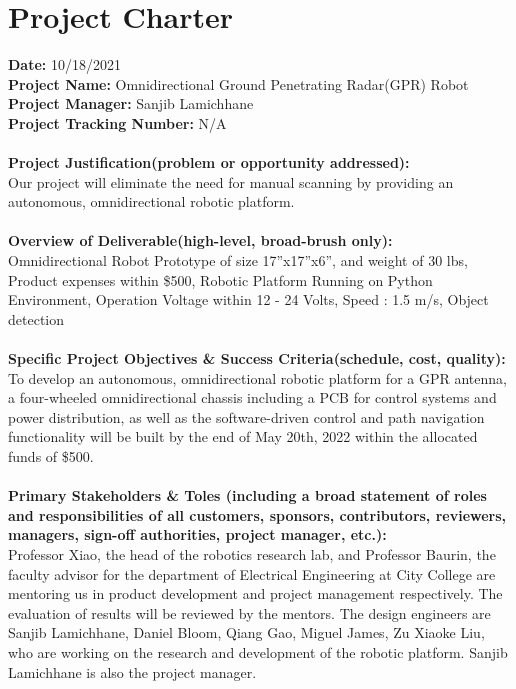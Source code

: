 \section{Project Charter}

\textbf{Date:} 10/18/2021\\
\textbf{Project Name:} Omnidirectional Ground Penetrating Radar(GPR) Robot 
\textbf{Project Manager:} Sanjib Lamichhane\\
\textbf{Project Tracking Number:} N/A \\
\\
\textbf{Project Justification(problem or opportunity addressed):}\\
Our project will eliminate the need for manual scanning by providing an autonomous, omnidirectional robotic platform.\\
\\
\textbf{Overview of Deliverable(high-level, broad-brush only):}\\
Omnidirectional Robot Prototype of size 17”x17”x6”, and weight of 30 lbs, Product expenses within \$500, Robotic Platform Running on Python Environment, Operation Voltage within 12 - 24 Volts, Speed : 1.5 m/s, Object detection
\\\\
\textbf{Specific Project Objectives \& Success Criteria(schedule, cost, quality):}\\
To develop an autonomous, omnidirectional robotic platform for a GPR antenna, a four-wheeled omnidirectional chassis including a PCB for control systems and power distribution, as well as the software-driven control and path navigation functionality will be built by the end of May 20th, 2022 within the allocated funds of \$500.\\
\\
\textbf{Primary Stakeholders \& Toles (including a broad statement of roles and responsibilities of all customers, sponsors, contributors, reviewers, managers, sign-off authorities, project manager, etc.):}\\
Professor Xiao, the head of the robotics research lab, and Professor Baurin, the faculty advisor for the department of Electrical Engineering at City College are mentoring us in product development and project management respectively. The evaluation of results will be reviewed by the mentors. The design engineers are Sanjib Lamichhane, Daniel Bloom, Qiang Gao, Miguel James, Zu Xiaoke Liu, who are working on the research and development of the robotic platform. Sanjib Lamichhane is also the project manager.\\

